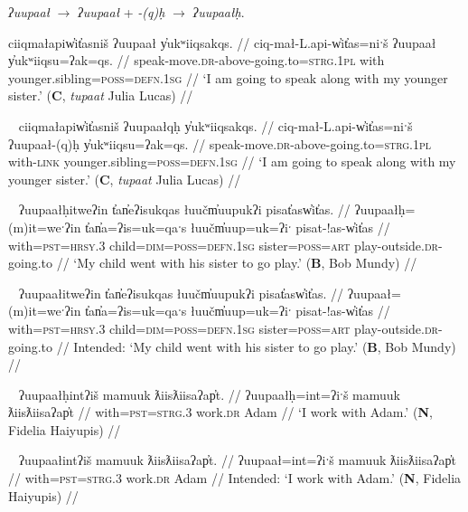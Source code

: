 \textit{ʔuupaał} $\rightarrow$ \textit{ʔuupaał} + \textit{-(q)ḥ} $\rightarrow$ \textit{ʔuupaałḥ}.

\ex \label{ex:uupaal1}
\begingl
\glpreamble ciiqmałapiw̓it̓asniš ʔuupaał y̓ukʷiiqsakqs. //
\gla ciq-mał-L.api-w̓it̓as=niˑš ʔuupaał y̓ukʷiiqsu=ʔak=qs. //
\glb speak-move.\textsc{dr}-above-going.to=\textsc{strg.1pl} with younger.sibling=\textsc{poss}=\textsc{defn.1sg} //
\glft `I am going to speak along with my younger sister.' (\textbf{C}, \textit{tupaat} Julia Lucas) //
\endgl
\xe

\ex~ \label{ex:uupaalqh1}
\begingl
\glpreamble ciiqmałapiw̓it̓asniš ʔuupaałqḥ y̓ukʷiiqsakqs. //
\gla ciq-mał-L.api-w̓it̓as=niˑš ʔuupaał-(q)ḥ y̓ukʷiiqsu=ʔak=qs. //
\glb speak-move.\textsc{dr}-above-going.to=\textsc{strg.1pl} with-\textsc{link} younger.sibling=\textsc{poss}=\textsc{defn.1sg} //
\glft `I am going to speak along with my younger sister.' (\textbf{C}, \textit{tupaat} Julia Lucas) //
\endgl
\xe

\ex~ \label{ex:uupaalh2}
\begingl
\glpreamble ʔuupaałḥitweʔin t̓an̓eʔisukqas łuučm̓uupukʔi pisat̓asw̓it̓as. //
\gla ʔuupaałḥ=(m)it=weˑʔin t̓an̓a=ʔis=uk=qaˑs łuučm̓uup=uk=ʔiˑ pisat-!as-w̓it̓as //
\glb with=\textsc{pst}=\textsc{hrsy.3} child=\textsc{dim}=\textsc{poss}=\textsc{defn.1sg} sister=\textsc{poss}=\textsc{art} play-outside.\textsc{dr}-going.to //
\glft `My child went with his sister to go play.' (\textbf{B}, Bob Mundy) //
\endgl
\xe

\ex~ \label{ex:*uupaal2}
\begingl
\glpreamble *ʔuupaałitweʔin t̓an̓eʔisukqas łuučm̓uupukʔi pisat̓asw̓it̓as. //
\gla ʔuupaał=(m)it=weˑʔin t̓an̓a=ʔis=uk=qaˑs łuučm̓uup=uk=ʔiˑ pisat-!as-w̓it̓as //
\glb with=\textsc{pst}=\textsc{hrsy.3} child=\textsc{dim}=\textsc{poss}=\textsc{defn.1sg} sister=\textsc{poss}=\textsc{art} play-outside.\textsc{dr}-going.to //
\glft Intended: `My child went with his sister to go play.' (\textbf{B}, Bob Mundy) //
\endgl
\xe

\ex~ \label{ex:uupaalh3}
\begingl
\glpreamble ʔuupaałḥintʔiš mamuuk ƛiisƛiisaʔap̓t. //
\gla ʔuupaałḥ=int=ʔiˑš mamuuk ƛiisƛiisaʔap̓t //
\glb with=\textsc{pst}=\textsc{strg.3} work.\textsc{dr} Adam //
\glft `I work with Adam.' (\textbf{N}, Fidelia Haiyupis) //
\endgl
\xe

\ex~ \label{ex:*uupaal3}
\begingl
\glpreamble *ʔuupaałintʔiš mamuuk ƛiisƛiisaʔap̓t. //
\gla ʔuupaał=int=ʔiˑš mamuuk ƛiisƛiisaʔap̓t //
\glb with=\textsc{pst}=\textsc{strg.3} work.\textsc{dr} Adam //
\glft Intended: `I work with Adam.' (\textbf{N}, Fidelia Haiyupis) //
\endgl
\xe
	
